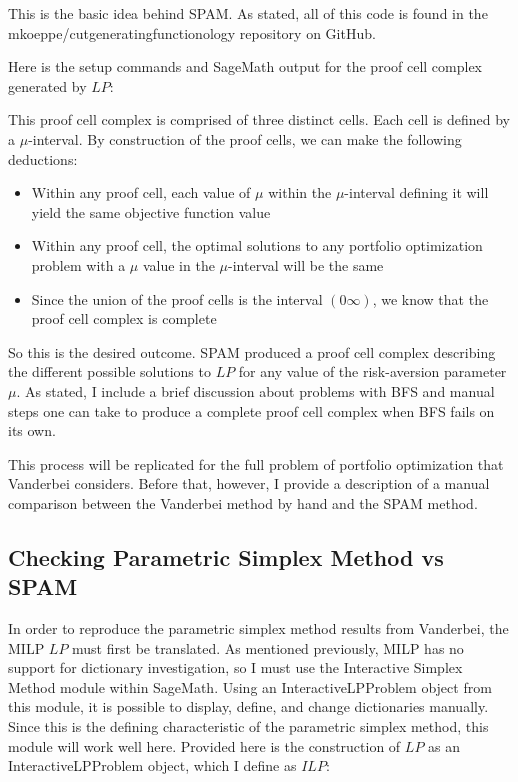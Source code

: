 \documentclass{article}
\begin{document}
This is the basic idea behind SPAM. As stated, all of this code is found in the mkoeppe/cutgeneratingfunctionology repository on GitHub.

Here is the setup commands and SageMath output for the proof cell complex generated by $LP$:



This proof cell complex is comprised of three distinct cells. Each cell is defined by a $\mu$-interval. By construction of the proof cells, we can make the following deductions:
\begin{itemize}
    \item Within any proof cell, each value of $\mu$ within the $\mu$-interval defining it will yield the same objective function value
    \item Within any proof cell, the optimal solutions to any portfolio optimization problem with a $\mu$ value in the $\mu$-interval will be the same
    \item Since the union of the proof cells is the interval $(0\infty)$, we know that the proof cell complex is complete
\end{itemize}

So this is the desired outcome. SPAM produced a proof cell complex describing the different possible solutions to $LP$ for any value of the risk-aversion parameter $\mu$. As stated, I include a brief discussion about problems with BFS and manual steps one can take to produce a complete proof cell complex when BFS fails on its own.

This process will be replicated for the full problem of portfolio optimization that Vanderbei considers. Before that, however, I provide a description of a manual comparison between the Vanderbei method by hand and the SPAM method. 

\subsection{Checking Parametric Simplex Method vs SPAM}

In order to reproduce the parametric simplex method results from Vanderbei, the MILP $LP$ must first be translated. As mentioned previously, MILP has no support for dictionary investigation, so I must use the Interactive Simplex Method module within SageMath. Using an InteractiveLPProblem object from this module, it is possible to display, define, and change dictionaries manually. Since this is the defining characteristic of the parametric simplex method, this module will work well here. Provided here is the construction of $LP$ as an InteractiveLPProblem object, which I define as $ILP$:
\end{document}
